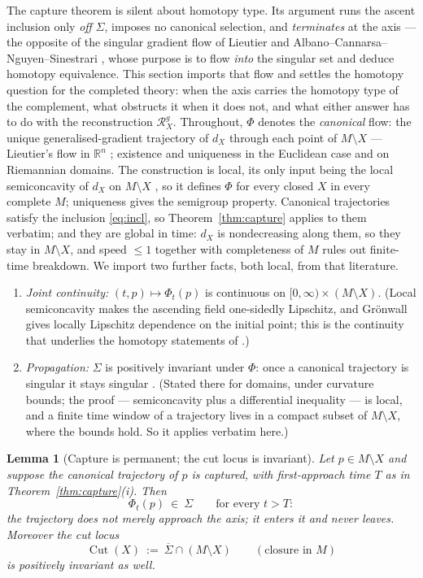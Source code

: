 \documentclass[11pt]{article}
\newtheorem{lemma}[theorem]{Lemma}
\theoremstyle{remark}
\newcommand{\R}{\mathbb{R}}
\newcommand{\X}{X}
\newcommand{\Rg}{\mathcal{R}^{g}_{\X}}
\newcommand{\dX}{d_{\X}}
\newcommand{\Cut}{\operatorname{Cut}}
\begin{document}
The capture theorem is silent about homotopy type. Its argument runs
the ascent inclusion only \emph{off} $\Sigma$, imposes no canonical
selection, and \emph{terminates} at the axis --- the opposite of the
singular gradient flow of Lieutier \cite{Lie} and
Albano--Cannarsa--Nguyen--Sinestrari \cite{ACNS}, whose purpose is to
flow \emph{into} the singular set and deduce homotopy equivalence.
This section imports that flow and settles the homotopy question for
the completed theory: when the axis carries the homotopy type of the
complement, what obstructs it when it does not, and what either
answer has to do with the reconstruction $\Rg$. Throughout, $\Phi$ denotes the \emph{canonical} flow: the
unique generalised-gradient trajectory of $\dX$ through each point
of $M\setminus\X$ --- Lieutier's flow in $\R^{n}$ \cite{Lie};
existence and uniqueness \cite[Thm.~3.4, Cor.~3.6]{ACNS} in the
Euclidean case and \cite[\S4]{ACNS} on Riemannian domains. The
construction is local, its only input being the local semiconcavity
of $\dX$ on $M\setminus\X$ \cite{ACa,MM}, so it defines $\Phi$ for
every closed $\X$ in every complete $M$; uniqueness gives the
semigroup property. Canonical trajectories satisfy the inclusion
\eqref{eq:incl}, so Theorem~\ref{thm:capture} applies to them
verbatim; and they are global in time: $\dX$ is nondecreasing along
them, so they stay in $M\setminus\X$, and speed $\le1$ together with
completeness of $M$ rules out finite-time breakdown. We import two
further facts, both local, from that literature.
\begin{enumerate}[label=\textup{(F\arabic*)}]
\item\label{F1} \emph{Joint continuity:}
$(t,p)\mapsto\Phi_{t}(p)$ is continuous on
$[0,\infty)\times(M\setminus\X)$. (Local semiconcavity makes the
ascending field one-sidedly Lipschitz, and Gr\"onwall gives locally
Lipschitz dependence on the initial point; this is the continuity
that underlies the homotopy statements of \cite{Lie,ACNS}.)
\item\label{F2} \emph{Propagation:} $\Sigma$ is positively invariant
under $\Phi$: once a canonical trajectory is singular it stays
singular \cite[Thms.~3.7 and~4.5]{ACNS}. (Stated there for domains,
under curvature bounds; the proof --- semiconcavity plus a
differential inequality --- is local, and a finite time window of a
trajectory lives in a compact subset of $M\setminus\X$, where the
bounds hold. So it applies verbatim here.)
\end{enumerate}

\begin{lemma}[Capture is permanent; the cut locus is invariant]
\label{lem:perm}
Let $p\in M\setminus\X$ and suppose the canonical trajectory of $p$
is captured, with first-approach time $T$ as in
Theorem~\ref{thm:capture}\textup{(i)}. Then
\[
  \Phi_{t}(p)\ \in\ \Sigma\qquad\text{for every }t>T :
\]
the trajectory does not merely approach the axis; it enters it and
never leaves. Moreover the cut locus
\[
  \Cut(\X)\ :=\ \overline{\Sigma}\cap(M\setminus\X)
  \qquad(\text{closure in }M)
\]
is positively invariant as well.
\end{lemma}
\end{document}
